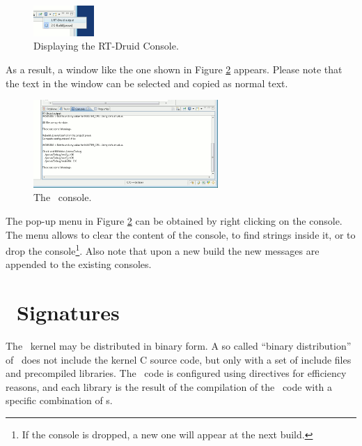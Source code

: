 \begin{figure}
  \begin{center}
    \includegraphics[width=2.3cm, bb=0 0 258 130]{images/console1.png}
  \end{center}
  \caption{Displaying the RT-Druid Console.}
  \label{fig:console1}
\end{figure}

As a result, a window like the one shown in Figure \ref{fig:console2}
appears. Please note that the text in the window can be selected and
copied as normal text.

\begin{figure}
  \begin{center}
    \includegraphics[width=7cm, bb=0 0 868 412]{images/console2.png}
  \end{center}
  \caption{The \rtd\ console.}
  \label{fig:console2}
\end{figure}

The pop-up menu in Figure \ref{fig:console2} can be obtained by right
clicking on the console. The menu allows to clear the content of the
console, to find strings inside it, or to drop the console\footnote{If
the console is dropped, a new one will appear at the next
build.}. Also note that upon a new build the new messages are appended
to the existing consoles.




\section{\ee\ Signatures}

The \ee\ kernel may be distributed in binary form. A so called
``binary distribution'' of \ee\ does not include the kernel C source
code, but only with a set of include files and precompiled
libraries. The \ee\ code is configured using 
directives for efficiency reasons, and each library is the result of
the compilation of the \ee\ code with a specific combination of
s.

